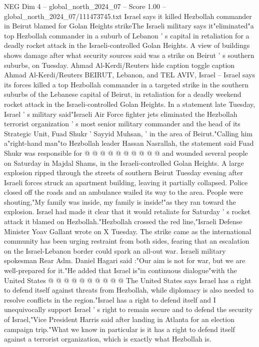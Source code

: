 \begin{textsample}{NEG Dim 4 – global\_north\_2024\_07 – Score 1.00 – global\_north\_2024\_07/111473745.txt}  \label{ex:f4_neg_268}
Israel says it killed Hezbollah commander in Beirut blamed for Golan Heights strikeThe Israeli military says it"eliminated"a top Hezbollah commander in a suburb of Lebanon ' s capital in retaliation for a deadly rocket attack in the Israeli-controlled Golan Heights.
A view of buildings shows damage after what security sources said was a strike on Beirut ' s southern suburbs, on Tuesday.
Ahmad Al-Kerdi/Reuters hide caption toggle caption Ahmad Al-Kerdi/Reuters BEIRUT, Lebanon, and TEL AVIV, Israel -- Israel says its forces killed a top Hezbollah commander in a targeted strike in the southern suburbs of the Lebanese capital of Beirut, in retaliation for a deadly weekend rocket attack in the Israeli-controlled Golan Heights.
In a statement late Tuesday, Israel ' s military said"Israeli Air Force fighter jets eliminated the Hezbollah terrorist organization ' s most senior military commander and the head of its Strategic Unit, Fuad Shukr ' Sayyid Muhsan, ' in the area of Beirut."Calling him a"right-hand man"to Hezbollah leader Hassan Nasrallah, the statement said Fuad Shukr was responsible for @ @ @ @ @ @ @ @ @ @ and wounded several people on Saturday in Majdal Shams, in the Israeli-controlled Golan Heights.
A large explosion ripped through the streets of southern Beirut Tuesday evening after Israeli forces struck an apartment building, leaving it partially collapsed.
Police closed off the roads and an ambulance wailed its way to the area.
People were shouting,"My family was inside, my family is inside!"as they ran toward the explosion.
Israel had made it clear that it would retaliate for Saturday ' s rocket attack it blamed on Hezbollah."Hezbollah crossed the red line,"Israeli Defense Minister Yoav Gallant wrote on X Tuesday.
The strike came as the international community has been urging restraint from both sides, fearing that an escalation on the Israel-Lebanon border could spark an all-out war.
Israeli military spokesman Rear Adm.
Daniel Hagari said :"Our aim is not for war, but we are well-prepared for it."He added that Israel is"in continuous dialogue"with the United States @ @ @ @ @ @ @ @ @ @ The United States says Israel has a right to defend itself against threats from Hezbollah, while diplomacy is also needed to resolve conflicts in the region."Israel has a right to defend itself and I unequivocally support Israel ' s right to remain secure and to defend the security of Israel,"Vice President Harris said after landing in Atlanta for an election campaign trip."What we know in particular is it has a right to defend itself against a terrorist organization, which is exactly what Hezbollah is.

\end{textsample}
